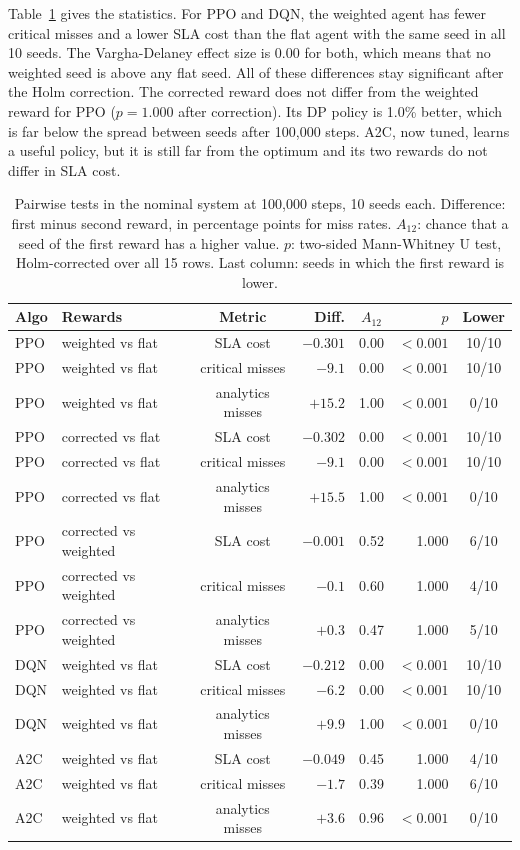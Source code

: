 \documentclass[journal]{IEEEtran}
\begin{document}
Table~\ref{tab:tests} gives the statistics. For PPO and DQN, the weighted agent has fewer critical misses and a lower SLA cost than the flat agent with the same seed in all 10 seeds. The Vargha-Delaney effect size is 0.00 for both, which means that no weighted seed is above any flat seed. All of these differences stay significant after the Holm correction. The corrected reward does not differ from the weighted reward for PPO ($p=1.000$ after correction). Its DP policy is 1.0\% better, which is far below the spread between seeds after 100,000 steps. A2C, now tuned, learns a useful policy, but it is still far from the optimum and its two rewards do not differ in SLA cost.

\begin{table}[t]
\caption{Pairwise tests in the nominal system at 100,000 steps, 10 seeds each. Difference: first minus second reward, in percentage points for miss rates. $A_{12}$: chance that a seed of the first reward has a higher value. $p$: two-sided Mann-Whitney U test, Holm-corrected over all 15 rows. Last column: seeds in which the first reward is lower.}
\label{tab:tests}
\centering
\footnotesize
\setlength{\tabcolsep}{1.8pt}
\begin{tabular}{@{}llcrcrc@{}}
\toprule
Algo & Rewards & Metric & Diff. & $A_{12}$ & $p$ & Lower \\
\midrule
PPO & weighted vs flat & SLA cost & $-0.301$ & 0.00 & $<0.001$ & 10/10 \\
PPO & weighted vs flat & critical misses & $-9.1$ & 0.00 & $<0.001$ & 10/10 \\
PPO & weighted vs flat & analytics misses & $+15.2$ & 1.00 & $<0.001$ & 0/10 \\
PPO & corrected vs flat & SLA cost & $-0.302$ & 0.00 & $<0.001$ & 10/10 \\
PPO & corrected vs flat & critical misses & $-9.1$ & 0.00 & $<0.001$ & 10/10 \\
PPO & corrected vs flat & analytics misses & $+15.5$ & 1.00 & $<0.001$ & 0/10 \\
PPO & corrected vs weighted & SLA cost & $-0.001$ & 0.52 & 1.000 & 6/10 \\
PPO & corrected vs weighted & critical misses & $-0.1$ & 0.60 & 1.000 & 4/10 \\
PPO & corrected vs weighted & analytics misses & $+0.3$ & 0.47 & 1.000 & 5/10 \\
\midrule
DQN & weighted vs flat & SLA cost & $-0.212$ & 0.00 & $<0.001$ & 10/10 \\
DQN & weighted vs flat & critical misses & $-6.2$ & 0.00 & $<0.001$ & 10/10 \\
DQN & weighted vs flat & analytics misses & $+9.9$ & 1.00 & $<0.001$ & 0/10 \\
\midrule
A2C & weighted vs flat & SLA cost & $-0.049$ & 0.45 & 1.000 & 4/10 \\
A2C & weighted vs flat & critical misses & $-1.7$ & 0.39 & 1.000 & 6/10 \\
A2C & weighted vs flat & analytics misses & $+3.6$ & 0.96 & $<0.001$ & 0/10 \\
\bottomrule
\end{tabular}
\end{table}
\end{document}
